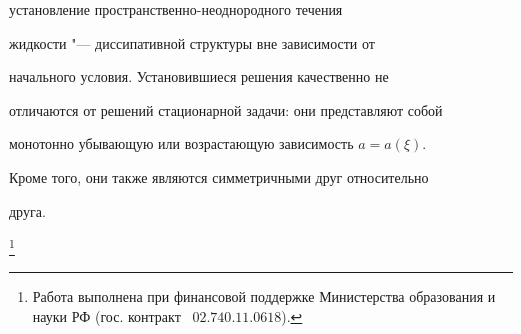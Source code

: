 установление про\-стран\-ствен\-но-не\-од\-но\-род\-но\-го течения

жидкости "--- диссипативной структуры вне зависимости от

начального условия. Установившиеся решения качественно не

отличаются от решений стационарной задачи: они представляют собой

монотонно убывающую или возрастающую зависимость $a=a(\xi )$.

Кроме того, они также являются симметричными  друг относительно

друга.



{\thanks{Работа выполнена при финансовой поддержке Министерства образования и науки РФ (гос. контракт \No~$02.740.11.0618$).}}



